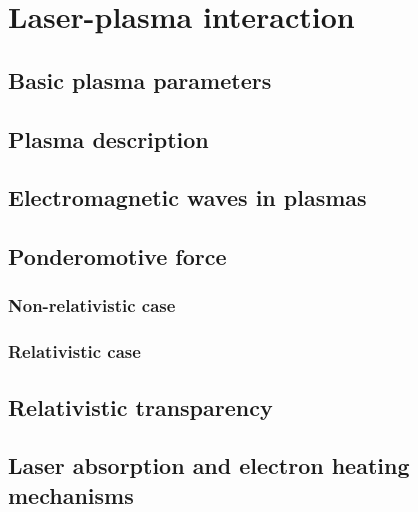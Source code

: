 \documentclass[12pt, twoside, a4paper, openright]{report}
\begin{document}

\chapter{Laser-plasma interaction}


\section{Basic plasma parameters}


\section{Plasma description}


\section{Electromagnetic waves in plasmas}


\section{Ponderomotive force}


\subsection{Non-relativistic case}


\subsection{Relativistic case}


\section{Relativistic transparency}
%

\section{Laser absorption and electron heating mechanisms}


%
\end{document}
